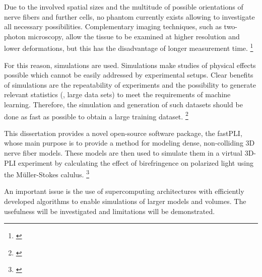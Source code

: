 Due to the involved spatial sizes and the multitude of possible orientations of nerve fibers and further cells, no phantom currently exists allowing to investigate all necessary possibilities.
Complementary imaging techniques, such as two-photon microscopy, allow the tissue to be examined at higher resolution and lower deformations, but this has the disadvantage of longer measurement time.
\footnote{\cite{Costantini2020}}
\par
% 
For this reason, simulations are used.
Simulations make studies of physical effects possible which cannot be easily addressed by experimental setups.
Clear benefits of simulations are the repeatability of experiments and the possibility to generate relevant statistics (\ie{}, large data sets) to meet \eg{} the requirements of machine learning.
Therefore, the simulation and generation of such datasets should be done as fast as possible to obtain a large training dataset.
\footnote{\cite{Ginsburger2018, ginsburgerDis2019, Callaghan2019, Menzel2020}}
\par
%
This dissertation provides a novel open-source software package, the \ac{fastPLI}, whose main purpose is to provide a method for modeling dense, non-colliding 3D nerve fiber models.
These models are then used to simulate them in a virtual \ac{3D-PLI} experiment by calculating the effect of birefringence on polarized light using the M{\"u}ller-Stokes calulus.
\footnote{\cite{Matuschke2019, Matuschke2021, Reuter2019}}
\par
% 
An important issue is the use of supercomputing architectures with efficiently developed algorithms to enable simulations of larger models and volumes.
The usefulness will be investigated and limitations will be demonstrated.